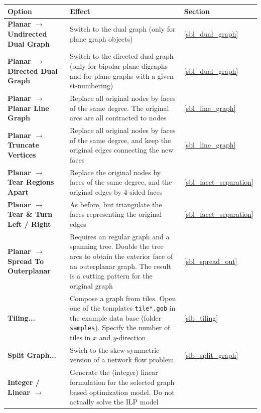 \documentclass[a4paper,11pt,twoside]{book}
\begin{document}
\vfill
\clearpage
\noindent
\begin{tabular}{p{7cm}|p{16.3cm}|p{1.5cm}} 
\large\bf Option &  \large\bf Effect & \large\bf Section \\
[1mm] \hline \hline
\bf Planar $\rightarrow$ Undirected Dual Graph &
    Switch to the dual graph (only for plane graph objects) &
    \ref{sbl_dual_graph} \\ \hline
\bf Planar $\rightarrow$ Directed Dual Graph &
    Switch to the directed dual graph (only for bipolar plane digraphs and
    for plane graphs with a given st-numbering) &
    \ref{sbl_dual_graph} \\ \hline
\bf Planar $\rightarrow$ Planar Line Graph &
    Replace all original nodes by faces of the same degree. The original
    arcs are all contracted to nodes &
    \ref{sbl_line_graph} \\ \hline
\bf Planar $\rightarrow$ Truncate Vertices &
    Replace all original nodes by faces of the same degree,
    and keep the original edges connecting the new faces &
    \ref{sbl_line_graph} \\ \hline
\bf Planar $\rightarrow$ Tear Regions Apart &
    Replace the original nodes by faces of the same degree,
    and the original edges by 4-sided faces &
    \ref{sbl_facet_separation} \\ \hline
\bf Planar $\rightarrow$ Tear \& Turn Left / Right &
    As before, but triangulate the faces representing the original edges &
    \ref{sbl_facet_separation} \\ \hline
\bf Planar $\rightarrow$ Spread To Outerplanar &
    Requires an regular graph and a spanning tree. Double the tree
    arcs to obtain the exterior face of an outerplanar graph. The
    result is a cutting pattern for the original graph &
    \ref{sbl_spread_out} \\ \hline
\bf Tiling... &
    Compose a graph from tiles. Open one of the templates
    \verb/tile*.gob/ in the example data base (folder \verb/samples/).
    Specify the number of tiles in $x$ and $y$-direction &
    \ref{slb_tiling} \\ \hline
\bf Split Graph... &
    Swich to the skew-symmetric version of a network flow problem &
    \ref{slb_split_graph} \\ \hline
\bf Integer / Linear $\rightarrow$ &
    Generate the (integer) linear formulation for the selected graph based
    optimization model. Do not actually solve the ILP model &
\end{tabular}
\end{document}
